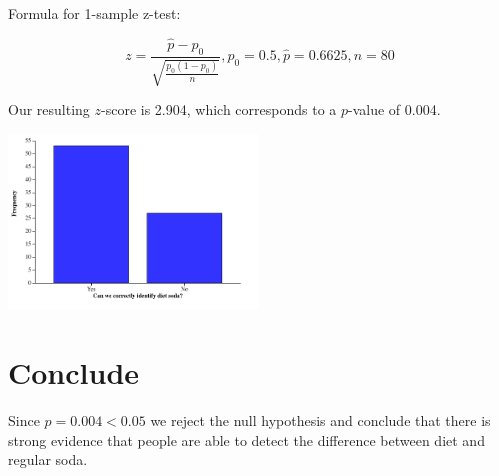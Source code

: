 \documentclass{scrreprt} %
\begin{document}
Formula for 1-sample z-test:

$$
z=\frac{\hat{p}-p_0}{\sqrt{\frac{p_0(1-p_0)}{n}}}, p_0 = 0.5, \hat{p} = 0.6625, n = 80
$$

Our resulting $z$-score is 2.904, which corresponds to a $p$-value of 0.004.

\includegraphics[width=250px]{2021-08-31-11-24-27.png}

\section{Conclude}

Since $p = 0.004 < 0.05$ we reject the null hypothesis and conclude that there
is strong evidence that people are able to detect the difference between diet
and regular soda.
\end{document}
